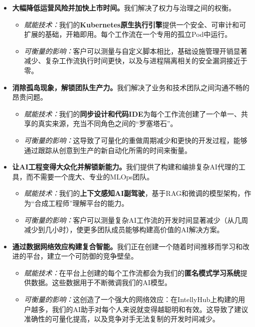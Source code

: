 \documentclass[11pt, a4paper, oneside]{article}
\begin{document}
\begin{itemize}
    \item \textbf{大幅降低运营风险并加快上市时间。}我们解决了权力与治理之间的权衡。
    \begin{itemize}
        \item \textit{赋能技术：}我们的\textbf{Kubernetes原生执行引擎}提供一个安全、可审计和可扩展的基础，开箱即用。每个工作流在一个专用的孤立Pod中运行。
        \item \textit{可衡量的影响：}客户可以测量与自定义脚本相比，基础设施管理开销显著减少、复杂工作流执行时间更快，以及与进程隔离相关的安全漏洞接近于零。
    \end{itemize}

    \item \textbf{消除孤岛现象，解锁团队生产力。}我们解决了业务和技术团队之间沟通不畅的昂贵问题。
    \begin{itemize}
        \item \textit{赋能技术：}我们的\textbf{同步设计和代码IDE}为每个工作流创建了一个单一、共享的真实来源，充当不同角色之间的“罗塞塔石”。
        \item \textit{可衡量的影响：}这导致了可量化的重做周期减少和更快的开发过程，能够通过跟踪从创意到生产的新自动化所需的时间来衡量。
    \end{itemize}

    \item \textbf{让AI工程变得大众化并解锁新能力。}我们提供了构建和编排复杂AI代理的工具，而不需要一个庞大、专业的MLOps团队。
    \begin{itemize}
        \item \textit{赋能技术：}我们的\textbf{上下文感知AI副驾驶}，基于RAG和微调的模型架构，作为“合成工程师”理解平台的能力。
        \item \textit{可衡量的影响：}客户可以测量复杂AI工作流的开发时间显著减少（从几周减少到几小时），使更多团队成员能够构建高价值的AI解决方案。
    \end{itemize}
    
    \item \textbf{通过数据网络效应构建复合智能。}我们正在创建一个随着时间推移而学习和改进的平台，建立一个可防御的竞争壁垒。
    \begin{itemize}
        \item \textit{赋能技术：}在平台上创建的每个工作流都会为我们的\textbf{匿名模式学习系统}提供数据。这些数据用于不断微调我们的AI模型。
        \item \textit{可衡量的影响：}这创造了一个强大的网络效应：在IntellyHub上构建的用户越多，我们的AI助手对每个人来说就变得越聪明和有效。这导致了建议准确性的可量化提高，以及竞争对手无法复制的开发时间减少。
    \end{itemize}
\end{itemize}
\end{document}
